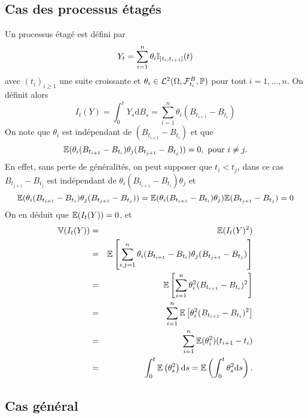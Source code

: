 \subsection{Cas des processus étagés}
Un processus étagé est défini par
$$
Y_t = \sum_{i=1}^n\theta_i\mathbb{I}_{]t_i,t_{i+1}]}(t)
$$
avec $(t_i)_{i\geq 1}$ une suite croissante et $\theta_i\in \mathcal{L}^2(\Omega,\mathcal{F}^B_{t_i},\mathbb{P})$ pour tout $i=1,\ldots, n$. On définit alors 
$$
I_t(Y) = \int_{0}^t Y_s\text{d}B_s = \sum_{i=1}^n\theta_i(B_{t_{i+1}}-B_{t_i})
$$
On note que $\theta_i$ est indépendant de $(B_{t_{i+1}}-B_{t_{i}})$ et que 
$$
\mathbb{E}(\theta_i(B_{t_{i+1}}-B_{t_{i}})\theta_j(B_{t_{j+1}}-B_{t_{j}})) = 0, \text{ pour }i\neq j.
$$
En effet, sans perte de généralités, on peut supposer que $t_{i} < t_{j}$, dans ce cas $B_{t_{j+1}}-B_{t_{j}}$ est indépendant de $\theta_i(B_{t_{i+1}}-B_{t_{i}})\theta_j$ et 
$$\mathbb{E}(\theta_i(B_{t_{i+1}}-B_{t_{i}})\theta_j(B_{t_{j+1}}-B_{t_{j}})) = \mathbb{E}(\theta_i(B_{t_{i+1}}-B_{t_{i}})\theta_j)\mathbb{E}(B_{t_{j+1}}-B_{t_{j}}) = 0$$
On en déduit que $\mathbb{E}(I_t(Y)) = 0$, et 
\begin{eqnarray*}
\mathbb{V}(I_t(Y)) &=& \mathbb{E}(I_t(Y)^2)\\
&=& \mathbb{E}\left[\sum_{i,j = 1}^n\theta_i(B_{t_{i+1}}-B_{t_{i}})\theta_j(B_{t_{j+1}}-B_{t_{j}})\right]\\
&=& \mathbb{E}\left[\sum_{i = 1}^n\theta_i^2(B_{t_{i+1}}-B_{t_{i}})^2\right]\\
&=& \sum_{i = 1}^n\mathbb{E}\left[\theta_i^2(B_{t_{i+1}}-B_{t_{i}})^2\right]\\
&=& \sum_{i = 1}^n\mathbb{E}(\theta_i^2)(t_{i+1}-t_{i})\\
&=& \int_0^t\mathbb{E}\left(\theta^2_s\right)\text{d}s = \mathbb{E}\left(\int_0^t\theta^2_s\text{d}s\right). \\
\end{eqnarray*}

\subsection{Cas général}

